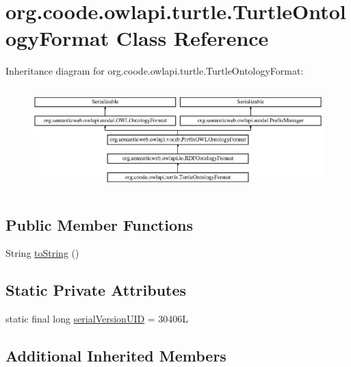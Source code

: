 \hypertarget{classorg_1_1coode_1_1owlapi_1_1turtle_1_1_turtle_ontology_format}{\section{org.\-coode.\-owlapi.\-turtle.\-Turtle\-Ontology\-Format Class Reference}
\label{classorg_1_1coode_1_1owlapi_1_1turtle_1_1_turtle_ontology_format}
}
Inheritance diagram for org.\-coode.\-owlapi.\-turtle.\-Turtle\-Ontology\-Format\-:\begin{figure}[H]
\begin{center}
\leavevmode
\includegraphics[height=4.011461cm]{classorg_1_1coode_1_1owlapi_1_1turtle_1_1_turtle_ontology_format}
\end{center}
\end{figure}
\subsection*{Public Member Functions}
\begin{DoxyCompactItemize}
\item 
String \hyperlink{classorg_1_1coode_1_1owlapi_1_1turtle_1_1_turtle_ontology_format_a6bc81fbec7bdcaaf77a7bdbb36395dd0}{to\-String} ()
\end{DoxyCompactItemize}
\subsection*{Static Private Attributes}
\begin{DoxyCompactItemize}
\item 
static final long \hyperlink{classorg_1_1coode_1_1owlapi_1_1turtle_1_1_turtle_ontology_format_ad641a80871b702aac54d773a13041068}{serial\-Version\-U\-I\-D} = 30406\-L
\end{DoxyCompactItemize}
\subsection*{Additional Inherited Members}


